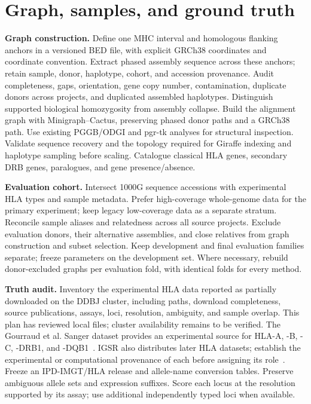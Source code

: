 \documentclass[10pt,a4paper]{article}
\begin{document}
\section{Graph, samples, and ground truth}
\textbf{Graph construction.}
Define one MHC interval and homologous flanking anchors in a versioned BED file,
with explicit GRCh38 coordinates and coordinate convention. Extract phased
assembly sequence across these anchors; retain sample, donor, haplotype, cohort,
and accession provenance. Audit completeness, gaps, orientation, gene copy
number, contamination, duplicate donors across projects, and duplicated assembled
haplotypes. Distinguish supported biological homozygosity from assembly collapse.
Build the alignment graph with Minigraph--Cactus, preserving phased donor paths
and a GRCh38 path. Use existing PGGB/ODGI and pgr-tk analyses for structural
inspection. Validate sequence recovery and the topology required for Giraffe
indexing and haplotype sampling before scaling. Catalogue classical HLA genes,
secondary DRB genes, paralogues, and gene presence/absence.

\textbf{Evaluation cohort.}
Intersect 1000G sequence accessions with experimental HLA types and sample
metadata. Prefer high-coverage whole-genome data for the primary experiment;
keep legacy low-coverage data as a separate stratum. Reconcile sample aliases
and relatedness across all source projects. Exclude evaluation donors, their
alternative assemblies, and close relatives from graph construction and subset
selection. Keep development and final evaluation families separate; freeze
parameters on the development set. Where necessary, rebuild donor-excluded
graphs per evaluation fold, with identical folds for every method.

\textbf{Truth audit.}
Inventory the experimental HLA data reported as partially downloaded on the
DDBJ cluster, including paths, download completeness, source publications,
assays, loci, resolution, ambiguity, and sample overlap. This plan has reviewed
local files; cluster availability remains to be verified. The Gourraud et al.
Sanger dataset provides an experimental source for HLA-A, -B, -C, -DRB1, and
-DQB1~\cite{truth}. IGSR also distributes later HLA datasets; establish the
experimental or computational provenance of each before assigning its role~\cite{igsr}.
Freeze an IPD-IMGT/HLA release and allele-name conversion tables. Preserve
ambiguous allele sets and expression suffixes. Score each locus at the resolution
supported by its assay; use additional independently typed loci when available.
\end{document}
